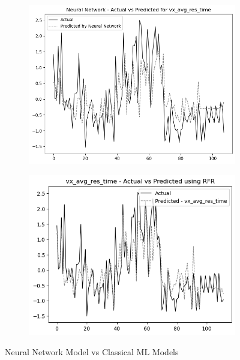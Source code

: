\begin{figure}
    \begin{subfigure}[b]{0.49\textwidth}
        \centering
        \includegraphics[width=\linewidth]{images/all_data_visual_avg_response_time.png}
    \end{subfigure}\hfill
    \begin{subfigure}[b]{0.49\textwidth}
        \centering
        \includegraphics[width=\linewidth]{images/all_data_visual_average_response_time.png}
    \end{subfigure}
    
    
    \caption{Neural Network Model vs Classical ML Models}
    \label{fig:nn_comparison}
\end{figure}



